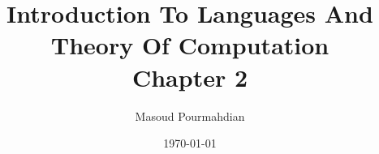 \documentclass[notheorems, aspectratio=1610]{beamer}
\title{Introduction To Languages And Theory Of Computation \\ Chapter 2}
\date{\today}
\author{Masoud Pourmahdian}
\begin{document}
\small














% 


\end{document}
